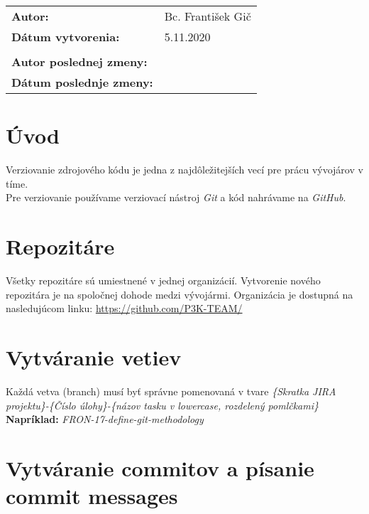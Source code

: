 \documentclass{article}
\begin{document}
    

    \begin{table}[h]
        \begin{tabular}{ll}
            \textbf{Autor:} & Bc. František Gič \\
            \textbf{Dátum vytvorenia:} & 5.11.2020 \\
            \\
            \textbf{Autor poslednej zmeny:} &  \\
            \textbf{Dátum poslednje zmeny:} &  \\
            \hline
        \end{tabular}
        \label{tab:grades}
    \end{table}

    \section*{Úvod}
        \textnormal{%
        Verziovanie zdrojového kódu je jedna z najdôležitejších vecí pre prácu vývojárov v tíme. \\
        Pre verziovanie používame verziovací nástroj \emph{Git} a kód nahrávame na \emph{GitHub}.
        }

    \section*{Repozitáre}

        \textnormal{%
        Všetky repozitáre sú umiestnené v jednej organizácií. Vytvorenie nového repozitára je na spoločnej dohode medzi vývojármi.
        Organizácia je dostupná na nasledujúcom linku: \href{https://github.com/P3K-TEAM/}{https://github.com/P3K-TEAM/}
        }

    \section*{Vytváranie vetiev}

        \textnormal{Každá vetva (branch) musí byť správne pomenovaná v tvare \emph{\{Skratka JIRA projektu\}-\{Číslo úlohy\}-\{názov tasku v lowercase, rozdelený pomlčkami\}}} \\
        \smallskip
        \textbf{Napríklad:} \emph{FRON-17-define-git-methodology}

    \section*{Vytváranie commitov a písanie commit messages}
\end{document}
